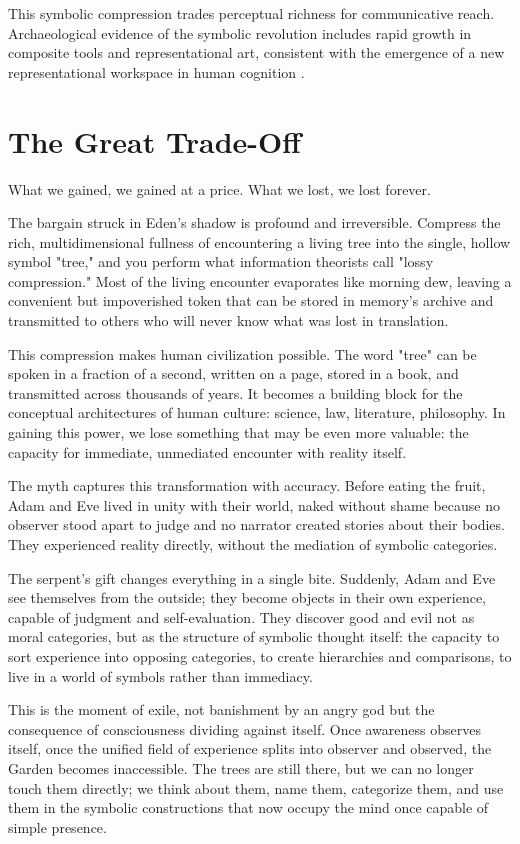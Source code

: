 This symbolic compression trades perceptual richness for communicative reach. Archaeological evidence of the symbolic revolution includes rapid growth in composite tools and representational art, consistent with the emergence of a new representational workspace in human cognition \parencite{dunbar1996grooming}.

\section{The Great Trade-Off}

What we gained, we gained at a price. What we lost, we lost forever.

The bargain struck in Eden's shadow is profound and irreversible. Compress the rich, multidimensional fullness of encountering a living tree into the single, hollow symbol "tree," and you perform what information theorists call "lossy compression." Most of the living encounter evaporates like morning dew, leaving a convenient but impoverished token that can be stored in memory's archive and transmitted to others who will never know what was lost in translation.

This compression makes human civilization possible. The word "tree" can be spoken in a fraction of a second, written on a page, stored in a book, and transmitted across thousands of years. It becomes a building block for the conceptual architectures of human culture: science, law, literature, philosophy. In gaining this power, we lose something that may be even more valuable: the capacity for immediate, unmediated encounter with reality itself.

The myth captures this transformation with accuracy. Before eating the fruit, Adam and Eve lived in unity with their world, naked without shame because no observer stood apart to judge and no narrator created stories about their bodies. They experienced reality directly, without the mediation of symbolic categories.

The serpent's gift changes everything in a single bite. Suddenly, Adam and Eve see themselves from the outside; they become objects in their own experience, capable of judgment and self-evaluation. They discover good and evil not as moral categories, but as the structure of symbolic thought itself: the capacity to sort experience into opposing categories, to create hierarchies and comparisons, to live in a world of symbols rather than immediacy.

This is the moment of exile, not banishment by an angry god but the consequence of consciousness dividing against itself. Once awareness observes itself, once the unified field of experience splits into observer and observed, the Garden becomes inaccessible. The trees are still there, but we can no longer touch them directly; we think about them, name them, categorize them, and use them in the symbolic constructions that now occupy the mind once capable of simple presence.

